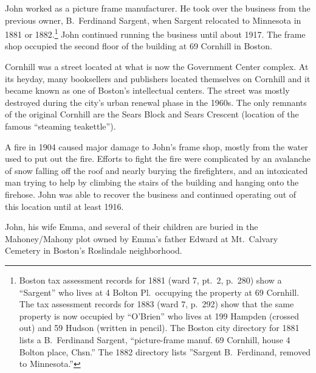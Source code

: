 John worked as a picture frame manufacturer.  He took over the business from the previous owner, B.\ Ferdinand Sargent,\cite{PictureFrameLabel} when Sargent relocated to Minnesota in 1881 or 1882.\footnote{Boston tax assessment records for 1881 (ward 7, pt.\ 2, p.\ 280) show a ``Sargent'' who lives at 4 Bolton Pl.\ occupying the property at 69 Cornhill. The tax assessment records for 1883 (ward 7, p.\ 292) show that the same property is now occupied by ``O'Brien'' who lives at 199 Hampden (crossed out) and 59 Hudson (written in pencil). The Boston city directory for 1881 lists a B.\ Ferdinand Sargent, ``picture-frame manuf. 69 Cornhill, house 4 Bolton place, Chsn.'' The 1882 directory lists ''Sargent B.\ Ferdinand, removed to Minnesota.''} John continued running the business until about 1917.\cite{John3OBrien1916:1} The frame shop occupied the second floor of the building at 69 Cornhill in Boston.\cite{John3OBrien1916:2} 

Cornhill was a street located at what is now the Government Center complex. At its heyday, many booksellers and publishers located themselves on Cornhill and it became known as one of Boston's intellectual centers.\cite{Cornhill:1} The street was mostly destroyed during the city's urban renewal phase in the 1960s. The only remnants of the original Cornhill are the Sears Block and Sears Crescent (location of the famous ``steaming teakettle'').\cite{Cornhill:2}

A fire in 1904 caused major damage to John's frame shop, mostly from the water used to put out the fire. Efforts to fight the fire were complicated by an avalanche of snow falling off the roof and nearly burying the firefighters, and an intoxicated man trying to help by climbing the stairs of the building and hanging onto the firehose.\cite{FrameShopFire:2} John was able to recover the business and continued operating out of this location until at least 1916.\cite{John3OBrien1916:3}

John, his wife Emma, and several of their children are buried in the Mahoney/Mahony plot owned by Emma's father Edward at Mt.\ Calvary Cemetery in Boston's Roslindale neighborhood.\cite{John3OBrienBurial:2}

